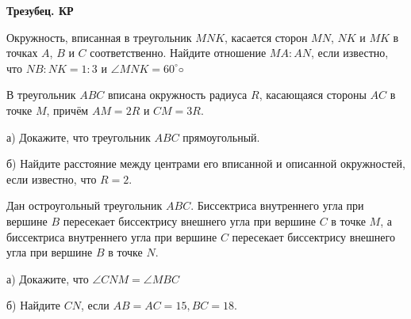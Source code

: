 \centerline{\bf \Huge Трезубец. КР}
\centerline{\bf \Huge }


 Окружность, вписанная в треугольник $MNK$, касается сторон $MN$, $NK$ и $MK$ в точках
$A$, $B$ и $C$ соответственно.  Найдите отношение $MA : AN$, если известно, что $NB : NK = 1 : 3$ и $\angle MNK = 60^{\circ}◦$

 В треугольник $ABC$ вписана окружность радиуса $R$, касающаяся стороны $AC$ в точке
$M$, причём $AM = 2R$ и $CM = 3R$.

а) Докажите, что треугольник $ABC$ прямоугольный.

б) Найдите расстояние между центрами его вписанной и описанной окружностей, если известно, что $R = 2.$

 Дан остроугольный треугольник $ABC$. Биссектриса внутреннего угла при вершине $B$
пересекает биссектрису внешнего угла при вершине $C$ в точке $M$, а биссектриса внутреннего
угла при вершине $C$ пересекает биссектрису внешнего угла при вершине $B$ в точке $N$.

а) Докажите, что $\angle CNM = \angle MBC$
 
б) Найдите $CN$, если $AB = AC = 15, BC = 18.$